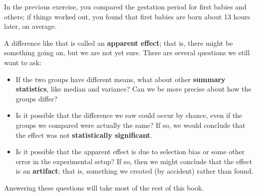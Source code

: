 \documentclass[12pt]{book}
\begin{document}
In the previous exercise, you compared the gestation period for first
babies and others; if things worked out, you found that first
babies are born about 13 hours later, on average.


A difference like that is called an {\bf apparent effect}; that is,
there might be something going on, but we are not yet sure.  There are
several questions we still want to ask:

\begin{itemize}

\item If the two groups have different means, what about other {\bf
  summary statistics}, like median and variance?  Can we be more
  precise about how the groups differ?


\item Is it possible that the difference we saw could occur by chance,
  even if the groups we compared were actually the same?  If so,
  we would conclude that the effect was not {\bf statistically
    significant}.



\item Is it possible that the apparent effect is due to selection bias or
  some other error in the experimental setup?  If so, then we might
  conclude that the effect is an {\bf artifact}; that is, something we
  created (by accident) rather than found. 


\end{itemize}

Answering these questions will take most of the rest of this book.
\end{document}
